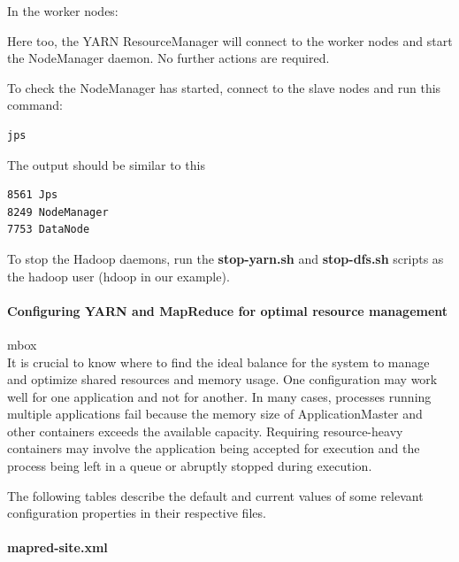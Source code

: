 \documentclass[12pt,english]{book}
\begin{document}
In the worker nodes:

Here too, the YARN ResourceManager will connect to the worker nodes and start the NodeManager daemon.
No further actions are required.

To check the NodeManager has started, connect to the slave nodes and run this command:
\begin{lstlisting}[language=bash, frame=single, basicstyle=\footnotesize]
jps
\end{lstlisting}
The output should be similar to this
\begin{lstlisting}[language=bash, frame=single, basicstyle=\footnotesize]
8561 Jps
8249 NodeManager
7753 DataNode
\end{lstlisting}

To stop the Hadoop daemons, run the \textbf{stop-yarn.sh} and \textbf{stop-dfs.sh} scripts as the hadoop user (hdoop in our example).


\paragraph{Configuring YARN and MapReduce for optimal resource management}mbox{}\\


It is crucial to know where to find the ideal balance for the system to manage and optimize shared resources and memory usage.
One configuration may work well for one application and not for another.
In many cases, processes running multiple applications fail because the memory size of ApplicationMaster and other containers exceeds the available capacity.
Requiring resource-heavy containers may involve the application being accepted for execution and the process being left in a queue or abruptly stopped during execution.

The following tables describe the default and current values of some relevant configuration properties in their respective files. 

\paragraph{mapred-site.xml}\mbox{}\\
\end{document}
